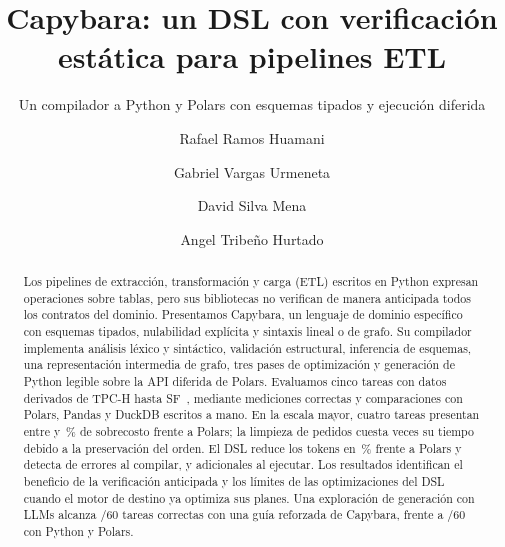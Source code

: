 \documentclass[sigplan,screen,nonacm]{acmart}
\begin{document}
\title{Capybara: un DSL con verificación estática para pipelines ETL}
\subtitle{Un compilador a Python y Polars con esquemas tipados y ejecución diferida}

\author{Rafael Ramos Huamani}
\author{Gabriel Vargas Urmeneta}
\author{David Silva Mena}
\author{Angel Tribeño Hurtado}

\begin{abstract}
Los pipelines de extracción, transformación y carga (ETL) escritos en Python expresan
operaciones sobre tablas, pero sus bibliotecas no verifican de manera anticipada todos los
contratos del dominio. Presentamos Capybara, un lenguaje de dominio específico con esquemas tipados,
nulabilidad explícita y sintaxis lineal o de grafo. Su compilador implementa análisis
léxico y sintáctico, validación estructural, inferencia de esquemas, una representación
intermedia de grafo, tres pases de optimización y generación de Python legible sobre
la API diferida de Polars. Evaluamos cinco tareas con datos derivados de TPC-H hasta
SF~\SFmax{}, mediante \mediciones{} mediciones correctas y comparaciones con Polars,
Pandas y DuckDB escritos a mano. En la escala mayor, cuatro tareas presentan entre
\dslPolarsMin{} y \dslPolarsMax{}\,\% de sobrecosto frente a Polars; la limpieza de pedidos
cuesta \limpiezaRazon{} veces su tiempo debido a la preservación del orden. El DSL reduce
los tokens en \tokensVsPolars{}\,\% frente a Polars y detecta \erroresCompilacion{} de
\erroresTotal{} errores al compilar, y \erroresEjecucion{} adicionales al ejecutar.
Los resultados identifican el beneficio de la verificación anticipada y los límites de
las optimizaciones del DSL cuando el motor de destino ya optimiza sus planes.
Una exploración de generación con LLMs alcanza \llmCapFinal{}/60 tareas correctas
con una guía reforzada de Capybara, frente a \llmPolFinal{}/60 con Python y Polars.
\end{abstract}


\maketitle
\end{document}
